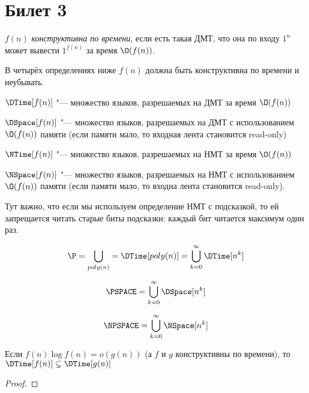 \setcounter{section}{2}
\section{Билет 3}
	\begin{Def}
		$f(n)$ \textit{конструктивна по времени}, если есть такая ДМТ, что она по входу $1^n$
		может вывести $1^{f(n)}$ за время $\O(f(n))$.
	\end{Def}
	\begin{Rem}
		В четырёх определениях ниже $f(n)$ должна быть конструктивна по времени и неубывать.
	\end{Rem}
	\begin{Def}
		$\DTime[f(n)]$ "--- множество языков, разрешаемых на ДМТ за время $\O(f(n))$
	\end{Def}
	\begin{Def}
		$\DSpace[f(n)]$ "--- множество языков, разрешаемых на ДМТ с использованием $\O(f(n))$ памяти (если памяти мало, то входная лента становится read-only)
	\end{Def}
	\begin{Def}
		$\NTime[f(n)]$ "--- множество языков, разрешаемых на НМТ за время $\O(f(n))$
	\end{Def}
	\begin{Def}
		$\NSpace[f(n)]$ "--- множество языков, разрешаемых на НМТ с использованием $\O(f(n))$ памяти (если памяти мало, то входна лента становится read-only).
	\end{Def}
	\begin{Rem}
		Тут важно, что если мы используем определение НМТ с подсказкой, то ей запрещается читать старые биты подсказки: каждый
		бит читается максимум один раз.
	\end{Rem}

	\begin{exmp}
		\[ \P = \bigcup_{poly(n)} = \DTime[poly(n)] = \bigcup\limits_{k=0}^{\infty} \DTime[n^k] \]
	\end{exmp}
	\begin{Def}
		\[ \PSPACE = \bigcup\limits_{k=0}^\infty \DSpace[n^k] \]
	\end{Def}
	\begin{Def}
		\[ \NPSPACE = \bigcup\limits_{k=0}^\infty \NSpace[n^k] \]
	\end{Def}

	\begin{theorem}
		Если $f(n) \log f(n) = o(g(n))$ (а $f$ и $g$ конструктивны по времени), то $\DTime[f(n)] \subsetneq \DTime[g(n)]$
	\end{theorem}
	\begin{proof}
		\TODO
	\end{proof}

